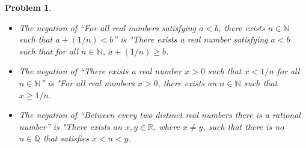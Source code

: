 \documentclass[12pt]{article}
\newtheorem{problem}{Problem}
\newcommand{\QQ}{\ensuremath{\mathbb Q}}
\newcommand{\RR}{\ensuremath{\mathbb R}}
\newcommand{\NN}{\ensuremath{\mathbb N}}
\begin{document}
\begin{problem} %


\begin{itemize}
	\item[(a)] The negation of ``For all real numbers satisfying $a<b$, there exists $n\in\NN$ such that $a+(1/n)<b$'' is "There exists a real number satisfying $a<b$ such that for all $n \in \NN$, $a + (1/n) \geq b$.

\item[(b)] The negation of ``There exists a real number $x>0$ such that $x<1/n$ for all $n\in\NN$'' is "For all real numbers $x > 0$, there exists an $n \in \NN$ such that $x \geq 1/n$.

\item[(b)] The negation of ``Between every two distinct real numbers there is a rational number'' is "There exists an $x,y \in \RR$, where $x \neq y$, such that there is no $n \in \QQ$ that satisfies $ x < n < y$.
\end{itemize}
\end{problem}
\end{document}
